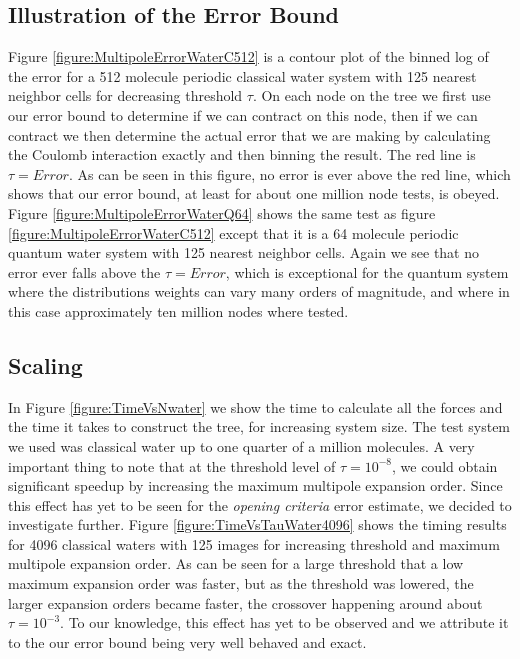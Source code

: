 \documentclass[prb,aps,nobibnotes,superbib,preprint]{revtex4}
\begin{document}
\subsection{Illustration of the Error Bound}

Figure \ref{figure:MultipoleErrorWaterC512} is a contour plot of the binned log of the error for a 
512 molecule periodic classical water system with 125 nearest neighbor cells for decreasing threshold $\tau$. 
On each node on the tree we first use our error bound to
determine if we can contract on this node, then if we can contract we then determine the actual error that we are
making by calculating the Coulomb interaction exactly and then binning the result. 
The red  line is $\tau=Error$. As can be seen in this figure, no error is ever above the red line, which shows that our
error bound, at least for about one million node tests, is obeyed. 
Figure \ref{figure:MultipoleErrorWaterQ64} shows the same test as figure \ref{figure:MultipoleErrorWaterC512} except
that it is a 64 molecule periodic quantum water system with 125 nearest neighbor cells. Again we see that no error
ever falls above the  $\tau=Error$, which is exceptional for the quantum system where the distributions weights can vary
many orders of magnitude, and where in this case approximately ten million nodes where tested.  

\subsection{Scaling}

In Figure \ref{figure:TimeVsNwater} we show the time to calculate all the forces and the time it takes
to construct the tree, for increasing system size. The test system we used was classical water up to one quarter of a 
million molecules. A very important thing to note that at the  threshold level of $\tau=10^{-8}$, 
we could obtain significant speedup by increasing the maximum multipole expansion order. Since this effect has 
yet to be seen for the {\it opening criteria} error estimate, 
we decided to investigate further. Figure \ref{figure:TimeVsTauWater4096} shows the timing results for 4096 classical waters 
with 125 images for increasing threshold and maximum multipole expansion order. As can be seen for a large threshold that
a low maximum expansion order was faster, but as the threshold was lowered, the larger expansion orders became faster, the
crossover happening around about $\tau=10^{-3}$. To our knowledge, this effect has yet to be observed and we attribute it to
the our error bound being very well behaved and exact. 
\end{document}
